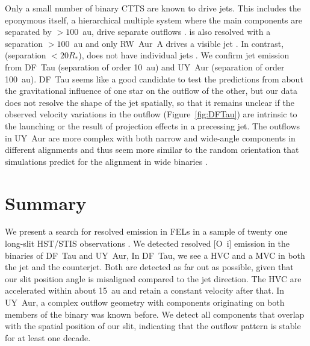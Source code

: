 \documentclass[twocolumn,trackchanges]{aastex63}
\begin{document}
Only a small number of binary CTTS are known to drive jets. This
  includes the eponymous  itself, a hierarchical multiple system
  where the main components are separated by $>100$~au, drive separate outflows \citep{1999ApJ...523..709S}.
  is also resolved with a separation $>100$~au  and only RW~Aur~A drives
 a visible jet \citep{2018ApJ...855..143S}. In contrast, 
 (separation $<20R_*$), does not have individual jets
 \citep{2010ApJ...708L...5M}. We confirm jet emission from DF~Tau (separation
 of order 10~au) and UY~Aur (separation of order 100~au). DF~Tau seems
 like a good candidate to test the predictions from \citet{2018ApJ...861...11S}
 about the gravitational influence of one star on the outflow of the other, but
 our data does not resolve the shape of the jet spatially, so that it remains
 unclear if the observed velocity variations in the outflow
 (Figure~\ref{fig:DFTau}) are intrinsic to the launching or the result of
 projection effects in a precessing jet. The outflows in UY~Aur are more
 complex \citep{2014ApJ...786...63P} with both narrow and wide-angle components in different alignments and
thus seem more similar to the random orientation that simulations predict for
the alignment in wide binaries \citep{2016ApJ...827L..11O}.

\section{Summary}
\label{Sect:summary}
We present a search for resolved emission in FELs in a sample of
twenty one long-slit HST/STIS observations . We detected resolved [O~{\sc i}] emission in the
binaries of DF~Tau and UY~Aur, 
In DF~Tau, we see a HVC and a MVC in
both the jet and the counterjet. Both are detected as far out as
possible, given that our slit position angle is misaligned compared to
the jet direction. The HVC are accelerated within about 15~au and
retain a constant velocity after that.  In UY~Aur, a complex outflow
geometry with components originating on both members of the binary was
known before. We detect all components that overlap with the spatial
position of our slit, indicating that the outflow pattern is stable
for at least one decade. 
\end{document}
